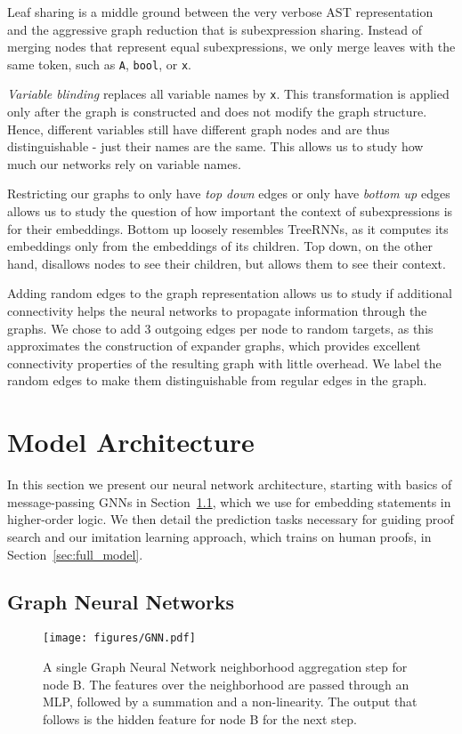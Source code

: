 \documentclass[letterpaper]{article} \usepackage{aaai20}  \usepackage{times}  \usepackage{helvet} \usepackage{courier}  \usepackage[hyphens]{url}  \usepackage{graphicx} \urlstyle{rm} \def\UrlFont{\rm}  \usepackage{graphicx}  \frenchspacing  \setlength{\pdfpagewidth}{8.5in}  \setlength{\pdfpageheight}{11in}
\begin{document}
Leaf sharing is a middle ground between the very verbose AST representation and the aggressive graph reduction that is subexpression sharing.
Instead of merging nodes that represent equal subexpressions, we only merge leaves with the same token, such as \texttt{A}, \texttt{bool}, or \texttt{x}.

\emph{Variable blinding} replaces all variable names by \texttt{x}. This transformation is applied only after the graph is constructed and does not modify the graph structure. Hence, different variables still have different graph nodes and are thus distinguishable - just their names are the same. This allows us to study how much our networks rely on variable names.

Restricting our graphs to only have \emph{top down} edges or only have \emph{bottom up} edges allows us to study the question of how important the context of subexpressions is for their embeddings.
Bottom up loosely resembles TreeRNNs, as it computes its embeddings only from the embeddings of its children.
Top down, on the other hand, disallows nodes to see their children, but allows them to see their context.

Adding random edges to the graph representation allows us to study if additional connectivity helps the neural networks to propagate information through the graphs.
We chose to add 3 outgoing edges per node to random targets, as this approximates the construction of expander graphs, which provides excellent connectivity properties of the resulting graph with little overhead.
We label the random edges to make them distinguishable from regular edges in the graph.
 \section{Model Architecture}
\label{sec:model_architectures}

In this section we present our neural network architecture, starting with basics of message-passing GNNs in Section~\ref{sec:gnn}, which we use for embedding statements in higher-order logic.
We then detail the prediction tasks necessary for guiding proof search and our imitation learning approach, which trains on human proofs, in Section~\ref{sec:full_model}.

\subsection{Graph Neural Networks}
\label{sec:gnn}

\begin{figure*}
\centering
\texttt{[image: figures/GNN.pdf]}
  \caption{A single Graph Neural Network neighborhood aggregation step for node B.
  The features over the neighborhood are passed through an MLP, followed by a summation and a non-linearity.
  The output that follows is the hidden feature for node B for the next step.}
  \label{fig:gnn-node-aggregation}
\end{figure*}
\end{document}
